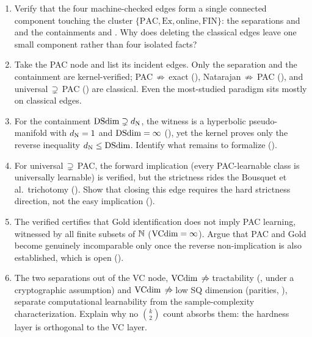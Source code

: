 \begin{enumerate}[leftmargin=*,itemsep=3pt]
\item Verify that the four machine-checked edges form a single connected component touching the cluster $\{\text{PAC}, \text{Ex}, \text{online}, \text{FIN}\}$: the separations  and  and the containments  and . Why does deleting the classical edges leave one small component rather than four isolated facts?

\item Take the PAC node and list its incident edges. Only the separation  and the containment  are kernel-verified; PAC$\,\not\Rightarrow\,$exact (\cite{Angluin1988, PittValiant1988}), Natarajan$\,\not\Rightarrow\,$PAC (\cite{BrukhimCarmonDinurMoranYehudayoff2022}), and universal$\,\supsetneq\,$PAC (\cite{BousquetHannekeMoranVanHandelYehudayoff2021}) are classical. Even the most-studied paradigm sits mostly on classical edges.

\item For the containment $\mathrm{DSdim} \supsetneq d_{\mathrm{N}}$, the witness is a hyperbolic pseudo-manifold with $d_{\mathrm{N}} = 1$ and $\mathrm{DSdim} = \infty$ (\cite{BrukhimCarmonDinurMoranYehudayoff2022}), yet the kernel proves only the reverse inequality $d_{\mathrm{N}} \le \mathrm{DSdim}$. Identify what remains to formalize ().

\item For universal$\,\supsetneq\,$PAC, the forward implication (every PAC-learnable class is universally learnable) is verified, but the strictness rides the Bousquet et al.\ trichotomy (\cite{BousquetHannekeMoranVanHandelYehudayoff2021}). Show that closing this edge requires the hard strictness direction, not the easy implication ().

\item The verified  certifies that Gold identification does not imply PAC learning, witnessed by all finite subsets of $\mathbb{N}$ ($\mathrm{VCdim} = \infty$). Argue that PAC and Gold become genuinely incomparable only once the reverse non-implication is also established, which is open ().

\item The two separations out of the VC node, $\mathrm{VCdim}\,\not\Rightarrow\,$tractability (\cite{KearnsValiant1994}, under a cryptographic assumption) and $\mathrm{VCdim}\,\not\Rightarrow\,$low SQ dimension (parities, \cite{BlumFurstJacksonKearnsMansourRudich1994}), separate computational learnability from the sample-complexity characterization. Explain why no $\binom{k}{2}$ count absorbs them: the hardness layer is orthogonal to the VC layer.


\end{enumerate}
